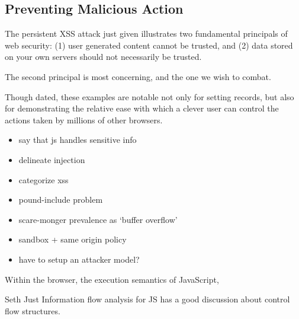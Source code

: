 
\subsection{Preventing Malicious Action}


The persistent XSS attack just given illustrates two fundamental principals of web security: (1) user generated content cannot be trusted, and (2) data stored on your own servers should not necessarily be trusted.

The second principal is most concerning, and the one we wish to combat.


Though dated, these examples are notable not only for setting records, but also for demonstrating the relative ease with which a clever user can control the actions taken by millions of other browsers.








\begin{itemize}
    \item say that js handles sensitive info
    \item delineate injection
    \item categorize xss
    \item pound-include problem
    \item scare-monger prevalence as `buffer overflow'
    \item sandbox + same origin policy
    \item have to setup an attacker model?
\end{itemize}

Within the browser, the execution semantics of JavaScript, 

Seth Just Information flow analysis for JS has a good discussion about control flow structures.

